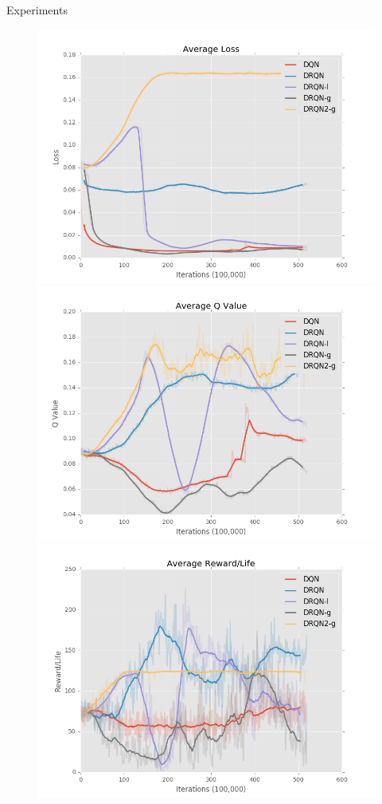 \documentclass[final]{beamer}
\newlength{\twocolwid}
\begin{document}
\begin{frame}[t]
\begin{columns}[t]
\begin{column}{\twocolwid}
\begin{column}{\twocolwid}
\begin{block}{Experiments}
\begin{figure}[h]
    \centering
    \begin{minipage}{1.0\textwidth}
        \centering
        \includegraphics[scale=0.7]{avg_loss}
        \centering
        \includegraphics[scale=0.7]{avg_q}
        \centering
        \includegraphics[scale=0.7]{avg_reward}

\end{minipage}
\end{figure}
\end{block}
\end{column}
\end{column}
\end{columns}
\end{frame}
\end{document}
